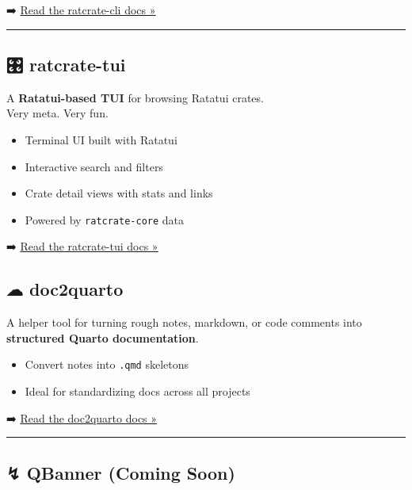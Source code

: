 \documentclass[
  letterpaper,
  DIV=11,
  numbers=noendperiod]{scrreprt}
\providecommand{\tightlist}{%
  \setlength{\itemsep}{0pt}\setlength{\parskip}{0pt}}
\begin{document}
➡️ \href{rat-cli/index.qmd}{Read the ratcrate-cli docs »}

\begin{center}\rule{0.5\linewidth}{0.5pt}\end{center}

\subsection{🎛 ratcrate-tui}\label{ratcrate-tui}

A \textbf{Ratatui-based TUI} for browsing Ratatui crates.\\
Very meta. Very fun.

\begin{itemize}
\tightlist
\item
  Terminal UI built with Ratatui\\
\item
  Interactive search and filters\\
\item
  Crate detail views with stats and links\\
\item
  Powered by \texttt{ratcrate-core} data
\end{itemize}

➡️ \href{rat-tui/index.qmd}{Read the ratcrate-tui docs »}

\subsection{☁︎ doc2quarto}\label{doc2quarto}

A helper tool for turning rough notes, markdown, or code comments into\\
\textbf{structured Quarto documentation}.

\begin{itemize}
\tightlist
\item
  Convert notes into \texttt{.qmd} skeletons\\
\item
  Ideal for standardizing docs across all projects
\end{itemize}

➡️ \href{doc2quarto/index.qmd}{Read the doc2quarto docs »}

\begin{center}\rule{0.5\linewidth}{0.5pt}\end{center}

\subsection{↯ QBanner (Coming Soon)}\label{qbanner-coming-soon}
\end{document}
